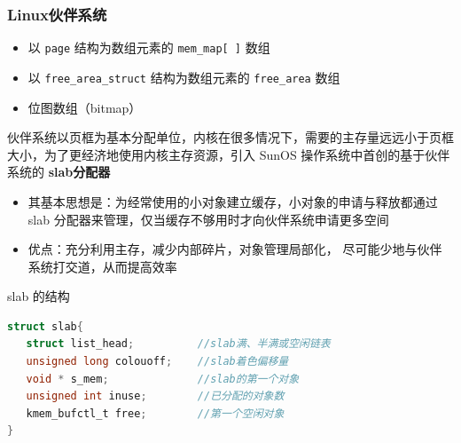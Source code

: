 \documentclass[cs4size,a4paper,10pt]{ctexart}
\begin{document}
		\subsubsection{Linux伙伴系统}
		\begin{itemize}
			\item 以 \verb|page| 结构为数组元素的 \verb|mem_map[ ]| 数组
			\item 以 \verb|free_area_struct| 结构为数组元素的 \verb|free_area| 数组
			\item 位图数组（bitmap）
		\end{itemize}
		伙伴系统以页框为基本分配单位，内核在很多情况下，需要的主存量远远小于页框大小，为了更经济地使用内核主存资源，引入 SunOS 操作系统中首创的基于伙伴系统的 \textbf{slab分配器}
		\begin{itemize}
			\item 其基本思想是：为经常使用的小对象建立缓存，小对象的申请与释放都通过 slab 分配器来管理，仅当缓存不够用时才向伙伴系统申请更多空间
			\item 优点：充分利用主存，减少内部碎片，对象管理局部化， 尽可能少地与伙伴系统打交道，从而提高效率
		\end{itemize}

		slab 的结构
		\begin{lstlisting}[language=C,keywordstyle=\color{black}]
struct slab{
   struct list_head;          //slab满、半满或空闲链表
   unsigned long colouoff;    //slab着色偏移量
   void * s_mem;              //slab的第一个对象
   unsigned int inuse;        //已分配的对象数
   kmem_bufctl_t free;        //第一个空闲对象
}
		\end{lstlisting}
\end{document}
